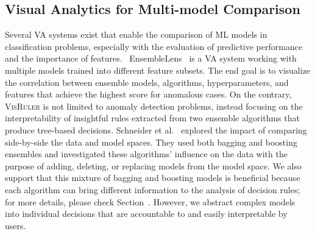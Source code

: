 \subsection{Visual Analytics for Multi-model Comparison}
Several VA systems exist that enable the comparison of ML models in classification problems, especially with the evaluation of predictive performance and the importance of features.~\cite{Xu2019EnsembleLens,Schneider2018Integrating,Talbot2009EnsembleMatrix,Zhang2019Manifold,Squares2017Ren,Gleicher2020Boxer,Das2020QUESTO,Li202020A,Ono2021Pipeline,Chatzimparmpas2021StackGenVis,Chatzimparmpas2021VisEvol} EnsembleLens~\cite{Xu2019EnsembleLens} is a VA system working with multiple models trained into different feature subsets. The end goal is to visualize the correlation between ensemble models, algorithms, hyperparameters, and features that achieve the highest score for anomalous cases. On the contrary, \textsc{VisRuler} is not limited to anomaly detection problems, instead focusing on the interpretability of insightful rules extracted from two ensemble algorithms that produce tree-based decisions. Schneider et al.~\cite{Schneider2018Integrating} explored the impact of comparing side-by-side the data and model spaces. They used both bagging and boosting ensembles and investigated these algorithms' influence on the data with the purpose of adding, deleting, or replacing models from the model space. We also support that this mixture of bagging and boosting models is beneficial because each algorithm can bring different information to the analysis of decision rules; for more details, please check Section~. However, we abstract complex models into individual decisions that are accountable to and easily interpretable by users.~\cite{Breiman2001Statistical}

